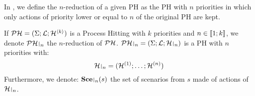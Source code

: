 In , we define the $n$-reduction of a given PH as the PH with $n$ priorities in which only actions of priority lower or equal to $n$ of the original PH are kept.
\begin{definition} %
\label{def:restriction}
  If $\mathcal{PH} = (\Sigma; \mathcal{L}; \mathcal{H}^{\langle k \rangle})$ is a Process Hitting with $k$ priorities and $n \in \llbracket 1; k \rrbracket$, we denote $\restriction{\PH}{n}$ %
  the $n$-reduction of $\mathcal{PH}$.
  $\restriction{\PH}{n} = (\PHs; \PHl; \restriction{\PHa}{n})$ is a PH with $n$ priorities with:
  $$\restriction{\PHa}{n} = (\PHa^{(1)}; \dots; \PHa^{(n)})$$
  Furthermore, we denote: $\restriction{\Sce}{n}(s)$ the set of scenarios from $s$ made of actions of $\restriction{\PHa}{n}$.
\end{definition}



